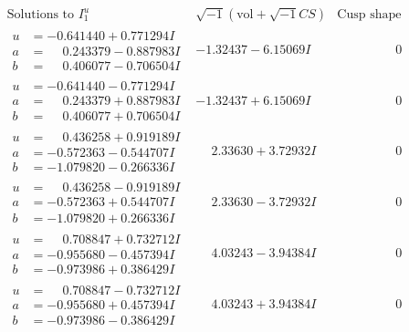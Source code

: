 \documentclass[1p]{elsarticle_modified}
\theoremstyle{definition}
\newcommand{\I}{\sqrt{-1}}
\begin{document}
$$\begin{array}{c|c|c}  
\text{Solutions to }I^u_{1}& \I (\text{vol} + \sqrt{-1}CS) & \text{Cusp shape}\\
 \hline 
\begin{aligned}
u &= -0.641440 + 0.771294 I \\
a &= \phantom{-}0.243379 - 0.887983 I \\
b &= \phantom{-}0.406077 - 0.706504 I\end{aligned}
 & -1.32437 - 6.15069 I & \phantom{-0.000000 } 0 \\ \hline\begin{aligned}
u &= -0.641440 - 0.771294 I \\
a &= \phantom{-}0.243379 + 0.887983 I \\
b &= \phantom{-}0.406077 + 0.706504 I\end{aligned}
 & -1.32437 + 6.15069 I & \phantom{-0.000000 } 0 \\ \hline\begin{aligned}
u &= \phantom{-}0.436258 + 0.919189 I \\
a &= -0.572363 - 0.544707 I \\
b &= -1.079820 - 0.266336 I\end{aligned}
 & \phantom{-}2.33630 + 3.72932 I & \phantom{-0.000000 } 0 \\ \hline\begin{aligned}
u &= \phantom{-}0.436258 - 0.919189 I \\
a &= -0.572363 + 0.544707 I \\
b &= -1.079820 + 0.266336 I\end{aligned}
 & \phantom{-}2.33630 - 3.72932 I & \phantom{-0.000000 } 0 \\ \hline\begin{aligned}
u &= \phantom{-}0.708847 + 0.732712 I \\
a &= -0.955680 - 0.457394 I \\
b &= -0.973986 + 0.386429 I\end{aligned}
 & \phantom{-}4.03243 - 3.94384 I & \phantom{-0.000000 } 0 \\ \hline\begin{aligned}
u &= \phantom{-}0.708847 - 0.732712 I \\
a &= -0.955680 + 0.457394 I \\
b &= -0.973986 - 0.386429 I\end{aligned}
 & \phantom{-}4.03243 + 3.94384 I & \phantom{-0.000000 } 0 \\ \hline\begin{aligned}

\end{aligned}
\end{array}$$
\end{document}
